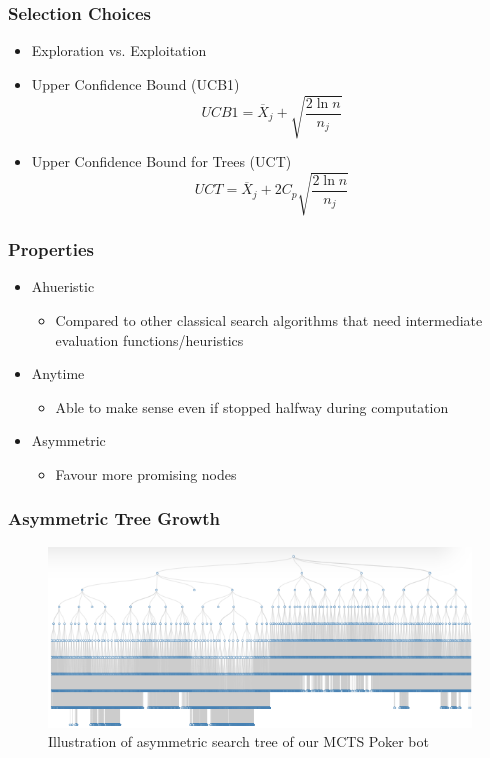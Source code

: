 \documentclass{beamer}
\begin{document}
  \begin{frame}
    \frametitle{Selection Choices}
    \begin{itemize}
      \item<1-> Exploration vs. Exploitation
      \item<2-> Upper Confidence Bound (UCB1)
      $$UCB1 = \overline{X}_j + \sqrt{\frac{2 \ln n}{n_j}}$$
      \item<3-> Upper Confidence Bound for Trees (UCT)
      $$UCT = \overline{X}_j + 2C_p\sqrt{\frac{2 \ln n}{n_j}}$$
    \end{itemize}
  \end{frame}
  
  \begin{frame}
    \frametitle{Properties}
    \begin{itemize}
      \item<1-> Ahueristic
      \begin{itemize}
        \item Compared to other classical search algorithms that need intermediate evaluation functions/heuristics
      \end{itemize}
      \item<2-> Anytime
      \begin{itemize}
        \item Able to make sense even if stopped halfway during computation
      \end{itemize}
      \item<3-> Asymmetric
      \begin{itemize}
        \item Favour more promising nodes
      \end{itemize}
    \end{itemize}
  \end{frame}
  
  \begin{frame}
    \frametitle{Asymmetric Tree Growth}
    \begin{figure}
        \includegraphics[width=\textwidth]{asymmetric.png}
        \caption{Illustration of asymmetric search tree of our MCTS Poker bot}
    \end{figure}
  \end{frame}
\end{document}
